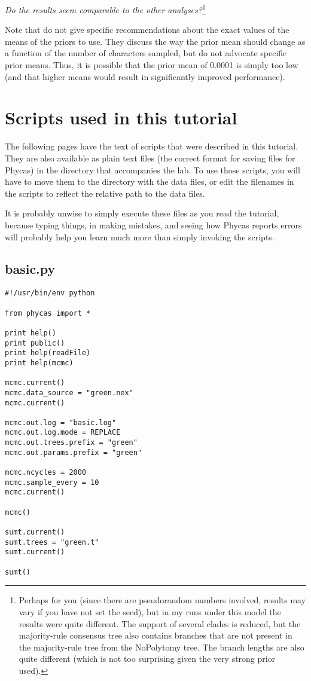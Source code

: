 \documentclass{article}
\newcommand{\phycas}{Phycas\xspace}
\newcommand{\QandA}[2]{\textit{#1}\footnote{#2}\xspace}
\begin{document}
\QandA{Do the results seem comparable to the other analyses?}{Perhaps for you (since there are pseudorandom numbers involved, results may vary if you have not set the seed), but in my runs under this model the results were quite different.
The support of several clades is reduced, but the majority-rule consensus tree also contains 
branches that are not present in the majority-rule tree from the NoPolytomy tree.
The branch lengths are also quite different (which is not too surprising given the very strong prior 
used).}

Note that \citet{YangR2005} do not give specific recommendations about the exact values of the means of  the priors to use.
They discuss the way the prior mean should change as a function of the number of characters sampled, but
do not advocate specific prior means.
Thus, it is possible that the prior mean of 0.0001 is simply too low (and that higher means would result in significantly improved performance).




\newpage
\section{Scripts used in this tutorial}
The following pages have the text of scripts that 
were described in this tutorial.
They are also available as plain text files (the 
correct format for saving files for \phycas) in
the directory that accompanies the lab.
To use those scripts, you will have to move them
to the directory with the data files, or edit the
filenames in the scripts to reflect the relative 
path to the data files.

It is probably unwise to simply execute these files
as you read the tutorial, because typing things, in
making mistakes, and seeing how \phycas reports
errors will probably help you learn much more 
than simply invoking the scripts.
\newpage
\subsection{basic.py}\label{basicpy}
\begin{verbatim}
#!/usr/bin/env python

from phycas import *

print help()
print public()
print help(readFile)
print help(mcmc)

mcmc.current()
mcmc.data_source = "green.nex"
mcmc.current()

mcmc.out.log = "basic.log"
mcmc.out.log.mode = REPLACE
mcmc.out.trees.prefix = "green"
mcmc.out.params.prefix = "green"

mcmc.ncycles = 2000 
mcmc.sample_every = 10
mcmc.current()

mcmc()

sumt.current()
sumt.trees = "green.t"
sumt.current()

sumt()
\end{verbatim}
\end{document}
